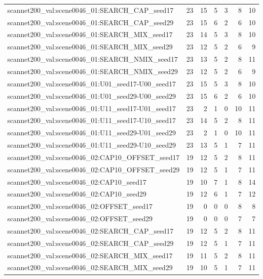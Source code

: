 \begin{table}[t]
\begin{tabular}{lrrrrrr}
scannet200\_val:scene0046\_01:SEARCH\_CAP\_seed17 & 23 & 15 & 5 & 3 & 8 & 10 \\
scannet200\_val:scene0046\_01:SEARCH\_CAP\_seed29 & 23 & 15 & 6 & 2 & 6 & 10 \\
scannet200\_val:scene0046\_01:SEARCH\_MIX\_seed17 & 23 & 14 & 5 & 3 & 8 & 10 \\
scannet200\_val:scene0046\_01:SEARCH\_MIX\_seed29 & 23 & 12 & 5 & 2 & 6 & 9 \\
scannet200\_val:scene0046\_01:SEARCH\_NMIX\_seed17 & 23 & 13 & 5 & 2 & 8 & 11 \\
scannet200\_val:scene0046\_01:SEARCH\_NMIX\_seed29 & 23 & 12 & 5 & 2 & 6 & 9 \\
scannet200\_val:scene0046\_01:U01\_seed17-U00\_seed17 & 23 & 15 & 5 & 3 & 8 & 10 \\
scannet200\_val:scene0046\_01:U01\_seed29-U00\_seed29 & 23 & 15 & 6 & 2 & 6 & 10 \\
scannet200\_val:scene0046\_01:U11\_seed17-U01\_seed17 & 23 & 2 & 1 & 0 & 10 & 11 \\
scannet200\_val:scene0046\_01:U11\_seed17-U10\_seed17 & 23 & 14 & 5 & 2 & 8 & 11 \\
scannet200\_val:scene0046\_01:U11\_seed29-U01\_seed29 & 23 & 2 & 1 & 0 & 10 & 11 \\
scannet200\_val:scene0046\_01:U11\_seed29-U10\_seed29 & 23 & 13 & 5 & 1 & 7 & 11 \\
scannet200\_val:scene0046\_02:CAP10\_OFFSET\_seed17 & 19 & 12 & 5 & 2 & 8 & 11 \\
scannet200\_val:scene0046\_02:CAP10\_OFFSET\_seed29 & 19 & 12 & 5 & 1 & 7 & 11 \\
scannet200\_val:scene0046\_02:CAP10\_seed17 & 19 & 10 & 7 & 1 & 8 & 14 \\
scannet200\_val:scene0046\_02:CAP10\_seed29 & 19 & 12 & 6 & 1 & 7 & 12 \\
scannet200\_val:scene0046\_02:OFFSET\_seed17 & 19 & 0 & 0 & 0 & 8 & 8 \\
scannet200\_val:scene0046\_02:OFFSET\_seed29 & 19 & 0 & 0 & 0 & 7 & 7 \\
scannet200\_val:scene0046\_02:SEARCH\_CAP\_seed17 & 19 & 12 & 5 & 2 & 8 & 11 \\
scannet200\_val:scene0046\_02:SEARCH\_CAP\_seed29 & 19 & 12 & 5 & 1 & 7 & 11 \\
scannet200\_val:scene0046\_02:SEARCH\_MIX\_seed17 & 19 & 11 & 5 & 2 & 8 & 11 \\
scannet200\_val:scene0046\_02:SEARCH\_MIX\_seed29 & 19 & 10 & 5 & 1 & 7 & 11 \\

\end{tabular}
\end{table}
